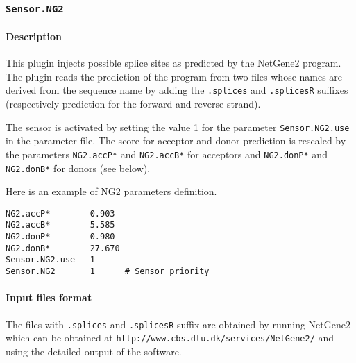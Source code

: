 
\subsubsection{\texttt{Sensor.NG2}}

\paragraph{Description}

This plugin injects possible splice sites as predicted by the
NetGene2 program. The plugin reads the prediction of the
program from two files whose names are derived from the sequence name
by adding the \texttt{.splices} and \texttt{.splicesR} suffixes
(respectively prediction for the forward and reverse strand).

The sensor is activated by setting the value 1 for the parameter
\texttt{Sensor.NG2.use} in the parameter file. The score for acceptor
and donor prediction is rescaled by the parameters {\tt NG2.accP*} and
{\tt NG2.accB*} for acceptors and {\tt NG2.donP*} and {\tt NG2.donB*} for
donors (see below).

Here is an example of NG2 parameters definition.
\begin{Verbatim}[fontsize=\small]
NG2.accP*        0.903
NG2.accB*        5.585
NG2.donP*        0.980
NG2.donB*        27.670
Sensor.NG2.use   1
Sensor.NG2       1      # Sensor priority
\end{Verbatim}

\paragraph{Input files format}

The files with \texttt{.splices} and \texttt{.splicesR} suffix are
obtained by running NetGene2 which can be obtained at
\texttt{http://www.cbs.dtu.dk/services/NetGene2/} and using the
detailed output of the software.

